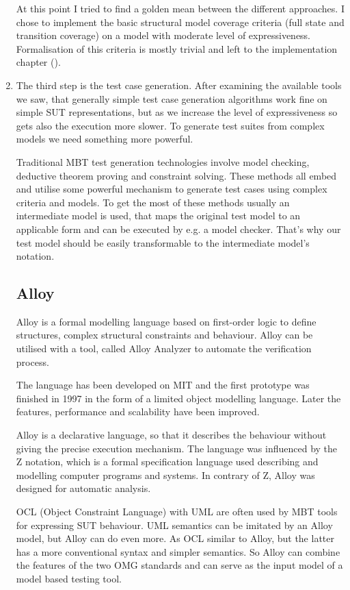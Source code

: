 \begin{enumerate}
At this point I tried to find a golden mean between the different approaches. I chose to implement the basic structural model coverage criteria (full state and transition coverage) on a model with moderate level of expressiveness. Formalisation of this criteria is mostly trivial and left to the implementation chapter (\cite{cha:implementation}).

\item The third step is the test case generation. After examining the available tools we saw, that generally simple test case generation algorithms work fine on simple SUT representations, but as we increase the level of expressiveness so gets also the execution more slower. To generate test suites from complex models we need something more powerful.

Traditional MBT test generation technologies involve model checking, deductive theorem proving and constraint solving. These methods all embed and utilise some powerful mechanism to generate test cases using complex criteria and models. To get the most of these methods usually an intermediate model is used, that maps the original test model to an applicable form and can be executed by e.g. a model checker. That's why our test model should be easily transformable to the intermediate model's notation.

\subsection{Alloy}
\label{sub:alloy}

Alloy is a formal modelling language based on first-order logic to define structures, complex structural constraints and behaviour. Alloy can be utilised with a tool, called Alloy Analyzer to automate the verification process.

The language has been developed on MIT and the first prototype was finished in 1997 in the form of a limited object modelling language. Later the features, performance and scalability have been improved.

Alloy is a declarative language, so that it describes the behaviour without giving the precise execution mechanism. The language was influenced by the Z notation, which is a formal specification language used describing and modelling computer programs and systems. In contrary of Z, Alloy was designed for automatic analysis.

OCL (Object Constraint Language) with UML are often used by MBT tools for expressing SUT behaviour. UML semantics can be imitated by an Alloy model, but Alloy can do even more. As OCL similar to Alloy, but the latter has a more conventional syntax and simpler semantics. So Alloy can combine the features of the two OMG standards and can serve as the input model of a model based testing tool.


\end{enumerate}
